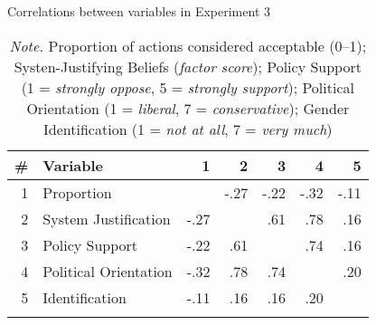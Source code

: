 \documentclass[12pt, letterpaper]{article}
\begin{document}
\begin{table}[t!]
\caption{Correlations between variables in Experiment 3}
\centering
\begin{tabular}{rlrrrrr}
\toprule
\# & Variable              &    1 &    2 &    3 &    4 &    5 \\ \midrule
 1 & Proportion            &      & -.27 & -.22 & -.32 & -.11 \\
 2 & System Justification  & -.27 &      &  .61 &  .78 &  .16 \\
 3 & Policy Support        & -.22 &  .61 &      &  .74 &  .16 \\
 4 & Political Orientation & -.32 &  .78 &  .74 &      &  .20 \\
 5 & Identification        & -.11 &  .16 &  .16 &  .20 &      \\ \bottomrule
\addlinespace
\end{tabular}
\caption*{\textit{Note.} Proportion of actions considered acceptable (0--1); Systen-Justifying Beliefs (\textit{factor score}); Policy Support (1 = \textit{strongly oppose}, 5 = \textit{strongly support}); Political Orientation (1 = \textit{liberal}, 7 = \textit{conservative}); Gender Identification (1 = \textit{not at all}, 7 = \textit{very much})}
\end{table}
\end{document}
